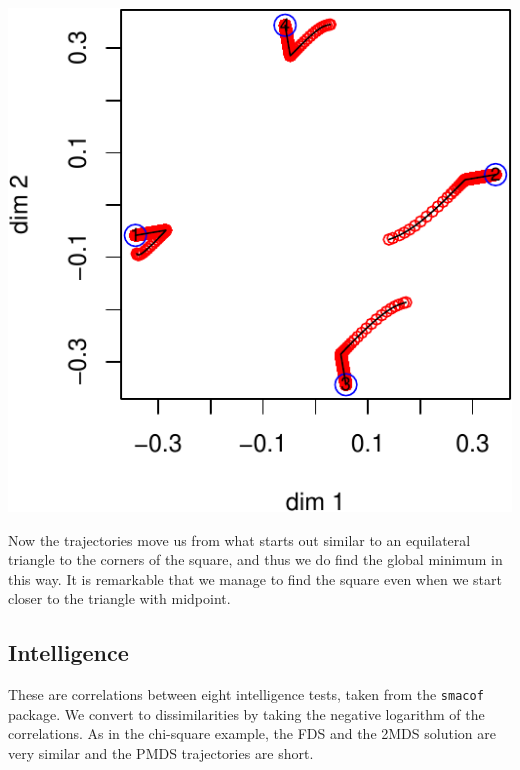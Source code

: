 \documentclass[
  12pt,
]{article}
\begin{document}
\begin{center}\includegraphics{penalty_files/figure-latex/simplex4b-1} \end{center}

Now the trajectories move us from what starts out similar to an
equilateral triangle to the corners of the square, and thus we do find
the global minimum in this way. It is remarkable that we manage to find
the square even when we start closer to the triangle with midpoint.

\hypertarget{intelligence}{%
\subsection{Intelligence}\label{intelligence}}

These are correlations between eight intelligence tests, taken from the
\texttt{smacof} package. We convert to dissimilarities by taking the
negative logarithm of the correlations. As in the chi-square example,
the FDS and the 2MDS solution are very similar and the PMDS trajectories
are short.
\end{document}
